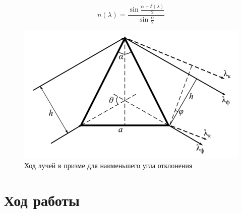 \documentclass[a4paper, 12pt]{article}%
\begin{document}
\begin{equation}\label{formula_n}
n(\lambda) = \frac{\sin \frac{\alpha + \delta (\lambda )}{2}}{\sin \frac{\alpha}{2}}
\end{equation}

\begin{figure}[h!]
\centering
\includegraphics[scale=0.5]{images/teor_1.png}
\caption{Ход лучей в призме для наименьшего угла отклонения}
\label{fig:teor_1}
\end{figure}

\section*{Ход работы}
\end{document}
